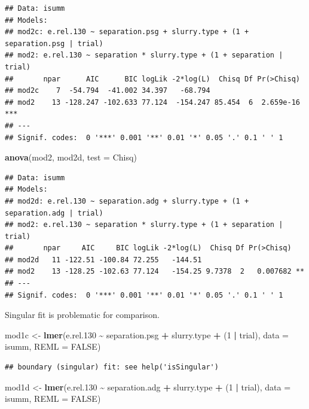 \documentclass[
]{article}
\newenvironment{Shaded}{\begin{snugshade}}{\end{snugshade}}
\newcommand{\AttributeTok}[1]{\textcolor[rgb]{0.13,0.29,0.53}{#1}}
\newcommand{\ConstantTok}[1]{\textcolor[rgb]{0.56,0.35,0.01}{#1}}
\newcommand{\DecValTok}[1]{\textcolor[rgb]{0.00,0.00,0.81}{#1}}
\newcommand{\FloatTok}[1]{\textcolor[rgb]{0.00,0.00,0.81}{#1}}
\newcommand{\FunctionTok}[1]{\textcolor[rgb]{0.13,0.29,0.53}{\textbf{#1}}}
\newcommand{\NormalTok}[1]{#1}
\newcommand{\OtherTok}[1]{\textcolor[rgb]{0.56,0.35,0.01}{#1}}
\newcommand{\SpecialCharTok}[1]{\textcolor[rgb]{0.81,0.36,0.00}{\textbf{#1}}}
\newcommand{\StringTok}[1]{\textcolor[rgb]{0.31,0.60,0.02}{#1}}
\begin{document}
\begin{verbatim}
## Data: isumm
## Models:
## mod2c: e.rel.130 ~ separation.psg + slurry.type + (1 + separation.psg | trial)
## mod2: e.rel.130 ~ separation * slurry.type + (1 + separation | trial)
##       npar      AIC      BIC logLik -2*log(L)  Chisq Df Pr(>Chisq)    
## mod2c    7  -54.794  -41.002 34.397   -68.794                         
## mod2    13 -128.247 -102.633 77.124  -154.247 85.454  6  2.659e-16 ***
## ---
## Signif. codes:  0 '***' 0.001 '**' 0.01 '*' 0.05 '.' 0.1 ' ' 1
\end{verbatim}

\begin{Shaded}
\begin{Highlighting}[]
\FunctionTok{anova}\NormalTok{(mod2, mod2d, }\AttributeTok{test =} \StringTok{\textquotesingle{}Chisq\textquotesingle{}}\NormalTok{)}
\end{Highlighting}
\end{Shaded}

\begin{verbatim}
## Data: isumm
## Models:
## mod2d: e.rel.130 ~ separation.adg + slurry.type + (1 + separation.adg | trial)
## mod2: e.rel.130 ~ separation * slurry.type + (1 + separation | trial)
##       npar     AIC     BIC logLik -2*log(L)  Chisq Df Pr(>Chisq)   
## mod2d   11 -122.51 -100.84 72.255   -144.51                        
## mod2    13 -128.25 -102.63 77.124   -154.25 9.7378  2   0.007682 **
## ---
## Signif. codes:  0 '***' 0.001 '**' 0.01 '*' 0.05 '.' 0.1 ' ' 1
\end{verbatim}

Singular fit is problematic for comparison.

\begin{Shaded}
\begin{Highlighting}[]
\NormalTok{mod1c }\OtherTok{\textless{}{-}} \FunctionTok{lmer}\NormalTok{(e.rel}\FloatTok{.130} \SpecialCharTok{\textasciitilde{}}\NormalTok{ separation.psg }\SpecialCharTok{+}\NormalTok{ slurry.type }\SpecialCharTok{+}\NormalTok{ (}\DecValTok{1} \SpecialCharTok{|}\NormalTok{ trial), }\AttributeTok{data =}\NormalTok{ isumm, }\AttributeTok{REML =} \ConstantTok{FALSE}\NormalTok{)}
\end{Highlighting}
\end{Shaded}

\begin{verbatim}
## boundary (singular) fit: see help('isSingular')
\end{verbatim}

\begin{Shaded}
\begin{Highlighting}[]
\NormalTok{mod1d }\OtherTok{\textless{}{-}} \FunctionTok{lmer}\NormalTok{(e.rel}\FloatTok{.130} \SpecialCharTok{\textasciitilde{}}\NormalTok{ separation.adg }\SpecialCharTok{+}\NormalTok{ slurry.type }\SpecialCharTok{+}\NormalTok{ (}\DecValTok{1} \SpecialCharTok{|}\NormalTok{ trial), }\AttributeTok{data =}\NormalTok{ isumm, }\AttributeTok{REML =} \ConstantTok{FALSE}\NormalTok{)}
\end{Highlighting}
\end{Shaded}
\end{document}

